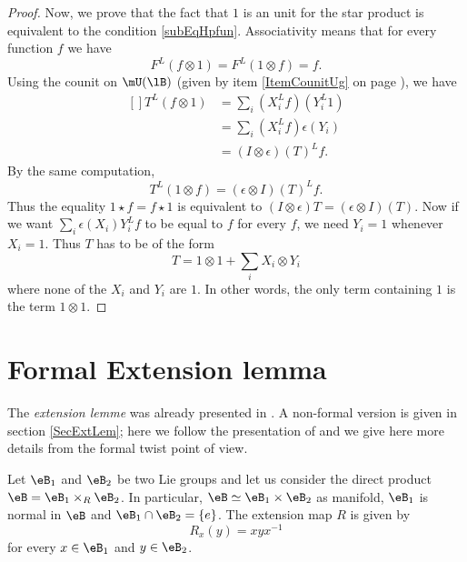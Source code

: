 \begin{proof}
	Now, we prove that the fact that $1$ is an unit for the star product is equivalent to the condition \eqref{subEqHpfun}. Associativity means that for every function $f$ we have
	\begin{equation}
		F^L(f\otimes 1)=F^L(1\otimes f)=f.
	\end{equation}
	Using the counit on $\mU(\lB)$ (given by item \ref{ItemCounitUg} on page \pageref{ItemCounitUg}), we have
	\begin{equation}
		\begin{aligned}[]
			T^L(f\otimes 1)&=\sum_i(X_i^Lf)(Y_i^L1)\\
			&=\sum_i(X_i^Lf)\epsilon(Y_i)\\
			&=(I\otimes \epsilon)(T)^Lf.
		\end{aligned}
	\end{equation}
	By the same computation,
	\begin{equation}
		T^L(1\otimes f)=(\epsilon\otimes I)(T)^Lf.
	\end{equation}
	Thus the equality $1\star f=f\star 1$ is equivalent to $(I\otimes\epsilon)T=(\epsilon\otimes I)(T)$. Now if we want $\sum_i\epsilon(X_i)Y_i^Lf$ to be equal to $f$ for every $f$, we need $Y_i=1$ whenever $X_i=1$. Thus $T$ has to be of the form
	\begin{equation}
		T=1\otimes 1+\sum_iX_i\otimes Y_i
	\end{equation}
	where none of the $X_i$ and $Y_i$ are $1$. In other words, the only term containing $1$ is the term $1\otimes 1$.
\end{proof}

\section{Formal Extension lemma}		\label{SecExtenLemK}

The \emph{extension lemme} was already presented in \cite{These,articleBVCS}. A non-formal version is given in section \ref{SecExtLem}; here we follow the presentation of \cite{QuantifKhalerian} and we give here more details from the formal twist point of view.

Let $\eB_1$ and $\eB_2$ be two Lie groups and let us consider the direct product $\eB=\eB_1\times_R\eB_2$. In particular, $\eB\simeq\eB_1\times\eB_2$ as manifold, $\eB_1$ is normal in $\eB$ and $\eB_1\cap\eB_2=\{ e \}$. The extension map $R$ is given by
\begin{equation}
	R_x(y)=xyx^{-1}
\end{equation}
for every $x\in\eB_1$ and $y\in\eB_2$.

